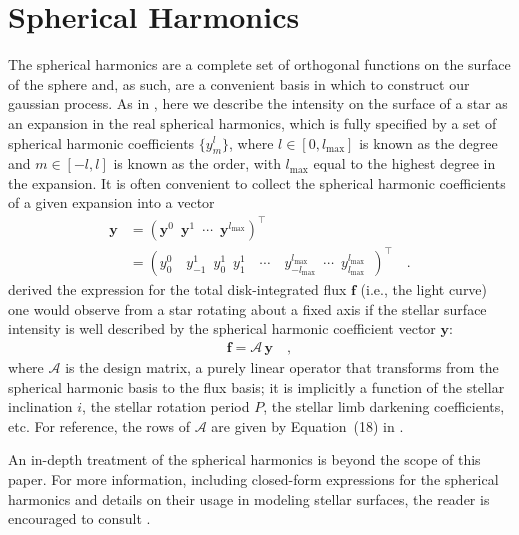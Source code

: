 \documentclass[modern]{aastex62}
\begin{document}
\section{Spherical Harmonics}
\label{sec:ylm}
%
The spherical harmonics are a complete set of orthogonal functions on the
surface of the sphere and, as such, are a convenient basis in which to construct
our gaussian process. As in \citet{Luger2019}, here we describe the intensity
on the surface of a star as an expansion in the real spherical harmonics, which is
fully specified by a set of spherical harmonic coefficients
$\{ y^l_m \}$, where $l \in [0, l_{\mathrm{max}}]$ is known as
the degree and
$m \in [-l, l]$ is known as the order, with $l_{\mathrm{max}}$ equal to the highest
degree in the expansion.
It is often convenient to collect the spherical harmonic coefficients of
a given expansion into a vector
%
\begin{align}
    \label{eq:y}
    \mathbf{y}
     & =
    \left(
    \mathbf{y}^0 \,\,\,
    \mathbf{y}^1 \,\,\,
    \cdots \,\,\,
    \mathbf{y}^{l_\mathrm{max}}
    \right)^\top
    \nonumber \\
     & =
    \left(
    y^0_0 \,\,\,
    \,\,\,
    y^1_{-1} \,\,\,
    y^1_{0} \,\,\,
    y^1_{1} \,\,\,
    \,\,\,
    \cdots \,\,\,
    \,\,\,
    y^{l_\mathrm{max}}_{-l_\mathrm{max}} \,\,\,
    \cdots \,\,\,
    y^{l_\mathrm{max}}_{l_\mathrm{max}} \,\,\,
    \right)^\top
    \quad.
\end{align}
%
\citet{Luger2019} derived the expression for the total disk-integrated
flux $\mathbf{f}$ (i.e., the light curve)
one would observe from a star rotating about a fixed axis
if the stellar surface intensity is well described by the spherical harmonic
coefficient vector $\mathbf{y}$:
%
\begin{align}
    \label{eq:fAy}
    \mathbf{f} = \pmb{\mathcal{A}} \, \mathbf{y}
    \quad,
\end{align}
%
where $\pmb{\mathcal{A}}$ is the \starry
design matrix, a purely linear operator that transforms from the spherical
harmonic basis to the flux basis; it is implicitly
a function of the stellar inclination $i$, the stellar
rotation period $P$, the stellar limb darkening coefficients, etc.
For reference, the rows of $\pmb{\mathcal{A}}$ are given by
Equation~(18) in \citet{Luger2019}.

An in-depth treatment of the spherical harmonics is beyond the scope of this
paper. For more information, including closed-form expressions for
the spherical harmonics
and details on their usage in modeling stellar surfaces, the reader is
encouraged to consult \citet{Luger2019}.
\end{document}
